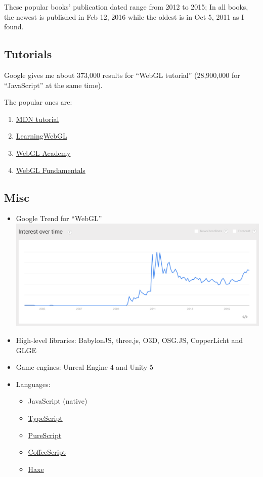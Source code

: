 These popular books' publication dated range from 2012 to 2015; In all
books, the newest is published in Feb 12, 2016 while the oldest is in
Oct 5, 2011 as I found.

\subsection{Tutorials}\label{tutorials}

Google gives me about 373,000 results for ``WebGL tutorial'' (28,900,000
for ``JavaScript'' at the same time).

The popular ones are:

\begin{enumerate}
\def\labelenumi{\arabic{enumi}.}
\tightlist
\item
  \href{https://developer.mozilla.org/en-US/docs/Web/API/WebGL_API/Tutorial}{MDN
  tutorial}
\item
  \href{http://learningwebgl.com/blog/}{LearningWebGL}
\item
  \href{http://www.webglacademy.com}{WebGL Academy}
\item
  \href{https://webglfundamentals.org}{WebGL Fundamentals}
\end{enumerate}

\subsection{Misc}\label{misc}

\begin{itemize}
\tightlist
\item
  Google Trend for ``WebGL'' \includegraphics{trend.png}
\item
  High-level libraries: BabylonJS, three.js, O3D, OSG.JS, CopperLicht
  and GLGE
\item
  Game engines: Unreal Engine 4 and Unity 5
\item
  Languages:

  \begin{itemize}
  \tightlist
  \item
    JavaScript (native)
  \item
    \href{http://typescript.away3d.com}{TypeScript}
  \item
    \href{https://github.com/jutaro/purescript-webgl}{PureScript}
  \item
    \href{http://www.coffeegl.com}{CoffeeScript}
  \item
    \href{http://haxor.xyz}{Haxe}
  \end{itemize}
\end{itemize}
